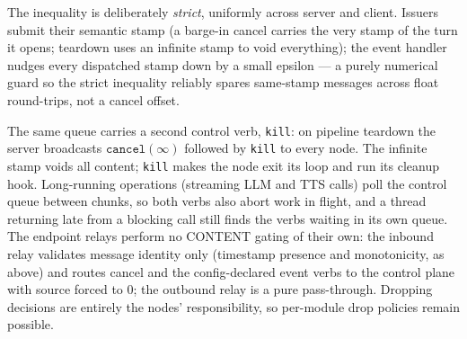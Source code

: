 \documentclass[11pt,a4paper]{article}
\begin{document}
The inequality is deliberately \emph{strict}, uniformly across server and client. Issuers submit their semantic stamp (a barge-in cancel carries the very stamp of the turn it opens; teardown uses an infinite stamp to void everything); the event handler nudges every dispatched stamp down by a small epsilon --- a purely numerical guard so the strict inequality reliably spares same-stamp messages across float round-trips, not a cancel offset.

The same queue carries a second control verb, \texttt{kill}: on pipeline teardown the server broadcasts $\texttt{cancel}(\infty)$ followed by \texttt{kill} to every node. The infinite stamp voids all content; \texttt{kill} makes the node exit its loop and run its cleanup hook. Long-running operations (streaming LLM and TTS calls) poll the control queue between chunks, so both verbs also abort work in flight, and a thread returning late from a blocking call still finds the verbs waiting in its own queue. The endpoint relays perform no CONTENT gating of their own: the inbound relay validates message identity only (timestamp presence and monotonicity, as above) and routes cancel and the config-declared event verbs to the control plane with source forced to 0; the outbound relay is a pure pass-through. Dropping decisions are entirely the nodes' responsibility, so per-module drop policies remain possible.
\end{document}
